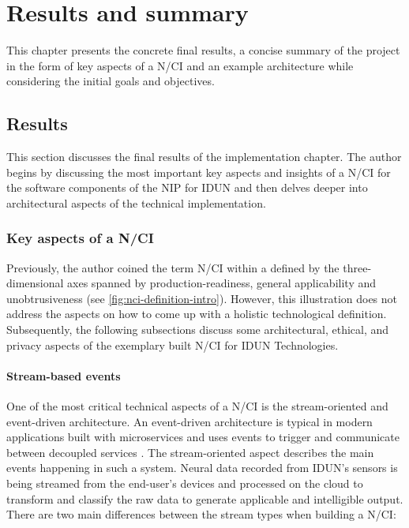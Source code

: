 \chapter{Results and summary}
\graphicspath{{Chapter5/Figs/}{Chapter5/Figs/}}

This chapter presents the concrete final results, a concise summary of the project in the form of key aspects of a N/CI and an example architecture while considering the initial goals and objectives.

\section{Results}
\label{chapter5-results}

This section discusses the final results of the implementation chapter. The author begins by discussing the most important key aspects and insights of a N/CI for the software components of the NIP for IDUN and then delves deeper into architectural aspects of the technical implementation.

\subsection{Key aspects of a N/CI}
\label{chapter5-key-aspects}

Previously, the author coined the term N/CI within a defined by the three-dimensional axes spanned by production-readiness, general applicability and unobtrusiveness (see \autoref{fig:nci-definition-intro}). However, this illustration does not address the aspects on how to come up with a holistic technological definition. Subsequently, the following subsections discuss some architectural, ethical, and privacy aspects of the exemplary built N/CI for IDUN Technologies.

\subsubsection{Stream-based events}
\label{chapter5-stream-based-events}

One of the most critical technical aspects of a N/CI is the stream-oriented and event-driven architecture. An event-driven architecture is typical in modern applications built with microservices and uses events to trigger and communicate between decoupled services \citep{amazon_web_services_inc_event-driven_nodate}. The stream-oriented aspect describes the main events happening in such a system. Neural data recorded from IDUN's sensors is being streamed from the end-user's devices and processed on the cloud to transform and classify the raw data to generate applicable and intelligible output. There are two main differences between the stream types when building a N/CI:

